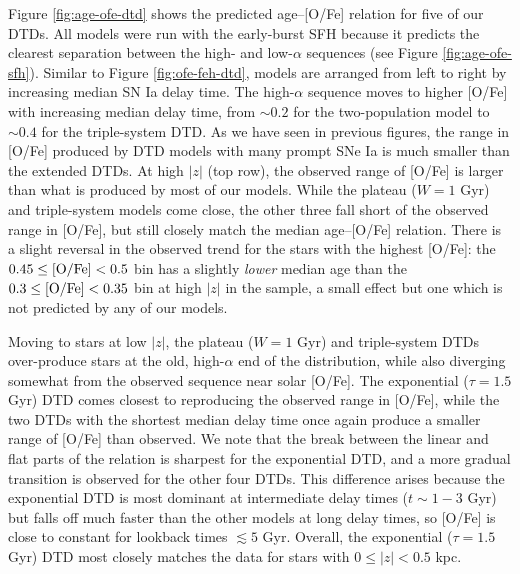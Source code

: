 \documentclass[twocolumn,twocolappendix]{aastex631}
\begin{document}
Figure \ref{fig:age-ofe-dtd} shows the predicted age--[O/Fe] relation for five of our DTDs. All models were run with the early-burst SFH because it predicts the clearest separation between the high- and low-$\alpha$ sequences (see Figure \ref{fig:age-ofe-sfh}). Similar to Figure \ref{fig:ofe-feh-dtd}, models are arranged from left to right by increasing median SN Ia delay time. The high-$\alpha$ sequence moves to higher [O/Fe] with increasing median delay time, from $\sim0.2$ for the two-population model to $\sim0.4$ for the triple-system DTD. As we have seen in previous figures, the range in [O/Fe] produced by DTD models with many prompt SNe Ia is much smaller than the extended DTDs. At high $|z|$ (top row), the observed range of [O/Fe] is larger than what is produced by most of our models. While the plateau ($W=1$ Gyr) and triple-system models come close, the other three fall short of the observed range in [O/Fe], but still closely match the median age--[O/Fe] relation. There is a slight reversal in the observed trend for the stars with the highest [O/Fe]: the $0.45\leq{\rm [O/Fe]}<0.5$ bin has a slightly \textit{lower} median age than the $0.3\leq{\rm [O/Fe]}<0.35$ bin at high $|z|$ in the  sample, a small effect but one which is not predicted by any of our models.

Moving to stars at low $|z|$, the plateau ($W=1$ Gyr) and triple-system DTDs over-produce stars at the old, high-$\alpha$ end of the distribution, while also diverging somewhat from the observed sequence near solar [O/Fe]. The exponential ($\tau=1.5$ Gyr) DTD comes closest to reproducing the observed range in [O/Fe], while the two DTDs with the shortest median delay time once again produce a smaller range of [O/Fe] than observed. We note that the break between the linear and flat parts of the relation is sharpest for the exponential DTD, and a more gradual transition is observed for the other four DTDs. This difference arises because the exponential DTD is most dominant at intermediate delay times ($t\sim 1-3$ Gyr) but falls off much faster than the other models at long delay times, so [O/Fe] is close to constant for lookback times $\lesssim 5$ Gyr. Overall, the exponential ($\tau=1.5$ Gyr) DTD most closely matches the data for stars with $0\leq|z|<0.5$ kpc.
\end{document}
